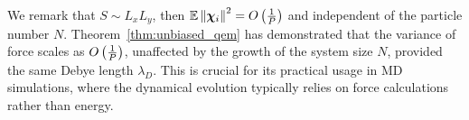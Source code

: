 We remark that $S \sim L_xL_y$, then $	\mathbb{E}\left\lVert\boldsymbol{\chi}_{i}\right\rVert^2=O\left(\frac{1}{P}\right)$ and independent of the particle number $N$.
Theorem~\ref{thm:unbiased_qem} has demonstrated that the variance of force scales as $O\left(\frac{1}{P}\right)$, unaffected by the growth of the system size $N$, provided the same Debye length $\lambda_{D}$. 
This is crucial for its practical usage in MD simulations, where the dynamical evolution typically relies on force calculations rather than energy. 


